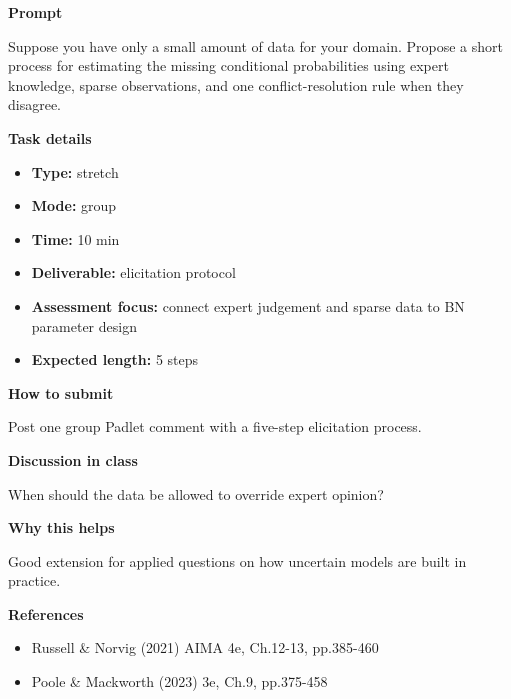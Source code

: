 \documentclass[11pt]{article}
\begin{document}
\begin{tcolorbox}[colback=white,colframe=MidnightBlue,title={Q6 Stretch Extension},fonttitle=\bfseries,breakable]
\begin{center}
\end{center}

{\large\bfseries\color{MidnightBlue} Prompt}\par\medskip
Suppose you have only a small amount of data for your domain. Propose a short process for estimating the missing conditional probabilities using expert knowledge, sparse observations, and one conflict-resolution rule when they disagree.

{\large\bfseries\color{MidnightBlue} Task details}\par\medskip
\begin{itemize}\item \textbf{Type:} stretch
\item \textbf{Mode:} group
\item \textbf{Time:} 10 min
\item \textbf{Deliverable:} elicitation protocol
\item \textbf{Assessment focus:} connect expert judgement and sparse data to BN parameter design
\item \textbf{Expected length:} 5 steps\end{itemize}

{\large\bfseries\color{MidnightBlue} How to submit}\par\medskip
Post one group Padlet comment with a five-step elicitation process.

{\large\bfseries\color{MidnightBlue} Discussion in class}\par\medskip
When should the data be allowed to override expert opinion?

{\large\bfseries\color{MidnightBlue} Why this helps}\par\medskip
Good extension for applied questions on how uncertain models are built in practice.

{\large\bfseries\color{MidnightBlue} References}\par\medskip
\begin{itemize}\item Russell \& Norvig (2021) AIMA 4e, Ch.12-13, pp.385-460
\item Poole \& Mackworth (2023) 3e, Ch.9, pp.375-458\end{itemize}
\end{tcolorbox}
\end{document}
